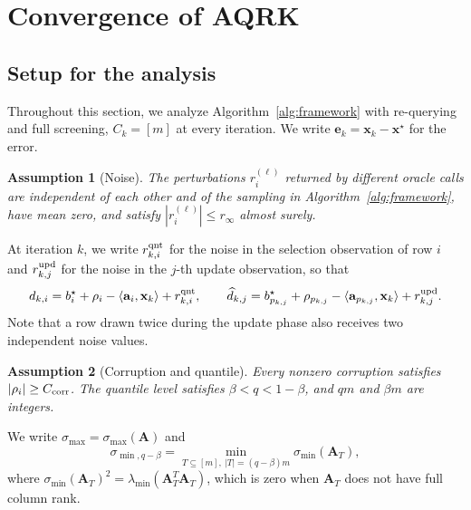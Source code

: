 \documentclass[pdflatex,sn-mathphys-num]{sn-jnl}
\theoremstyle{thmstyleone}
\newtheorem{assumption}{Assumption}
\theoremstyle{thmstylethree}
\newcommand{\mA}{\mathbf{A}}
\newcommand{\vx}{\mathbf{x}}
\newcommand{\va}{\mathbf{a}}
\newcommand{\ve}{\mathbf{e}}
\begin{document}
\section{Convergence of AQRK}
\label{sec:convergence}

\subsection{Setup for the analysis}
\label{subsec:analysis_setup}
Throughout this section, we analyze Algorithm~\ref{alg:framework} with
re-querying and full screening, $C_k=[m]$ at every iteration. We write $\ve_k=\vx_k-\vx^\star$ for the error.

\begin{assumption}[Noise]
\label{as:model}
The perturbations $r_i^{(\ell)}$ returned by different oracle calls are
independent of each other and of the sampling in
Algorithm~\ref{alg:framework}, have mean zero, and satisfy
$|r_i^{(\ell)}|\le r_\infty$ almost surely.
\end{assumption}

At iteration $k$, we write $r^{\rm qnt}_{k,i}$ for the noise in the selection
observation of row $i$ and $r^{\rm upd}_{k,j}$ for the noise in the $j$-th
update observation, so that
\[
d_{k,i}=b_i^\star+\rho_i-\langle\va_i,\vx_k\rangle+r^{\rm qnt}_{k,i},
\qquad
\widehat d_{k,j}=b_{p_{k,j}}^\star+\rho_{p_{k,j}}
-\langle\va_{p_{k,j}},\vx_k\rangle+r^{\rm upd}_{k,j}.
\]
Note that a row drawn
twice during the update phase also receives two independent noise values.

\begin{assumption}[Corruption and quantile]
\label{as:high_separation}
Every nonzero corruption satisfies $|\rho_i|\ge C_{\rm corr}$. The quantile
level satisfies $\beta<q<1-\beta$, and $qm$ and $\beta m$ are integers.
\end{assumption}

We write $\sigma_{\max}=\sigma_{\max}(\mA)$ and
\[
\sigma_{\min,q-\beta}=\min_{T\subseteq[m],\ |T|=(q-\beta)m}\sigma_{\min}(\mA_T),
\]
where $\sigma_{\min}(\mA_T)^2=\lambda_{\min}(\mA_T^T\mA_T)$, which is zero when
$\mA_T$ does not have full column rank.
\end{document}
